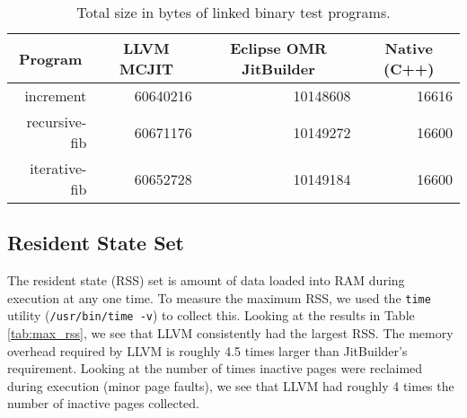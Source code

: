 \begin{table*}[t]
  \begin{tabular}{|r|l|l|l|} 
  \hline
  \multicolumn{1}{|c|}{\textbf{Program}}
  & \multicolumn{1}{c|}{\textbf{LLVM MCJIT}}                      
  & \multicolumn{1}{c|}{\textbf{Eclipse OMR JitBuilder}}
  & \multicolumn{1}{c|}{\textbf{Native (C++)}}                    
  \\ \hline

  increment                               
  & \multicolumn{1}{r|}{\num{60640216}} %
  & \multicolumn{1}{r|}{\num{10148608}} %
  & \multicolumn{1}{r|}{\num{16616}}    %
  \\ \hline
  
  recursive-fib                           
  & \multicolumn{1}{r|}{\num{60671176}} %
  & \multicolumn{1}{r|}{\num{10149272}} %
  & \multicolumn{1}{r|}{\num{16600}}   %
  \\ \hline
  
  iterative-fib                           
  & \multicolumn{1}{r|}{\num{60652728}} %
  & \multicolumn{1}{r|}{\num{10149184}} %
  & \multicolumn{1}{r|}{\num{16600}}   %
  \\ \hline
  
\end{tabular}
  \caption{Total size in bytes of linked binary test programs.}
  \label{tab:size_in_bytes}
\end{table*}

\subsection{Resident State Set}
The resident state (RSS) set is amount of data loaded into RAM during execution at any one time.
To measure the maximum RSS, we used the \texttt{time} utility (\texttt{/usr/bin/time -v}) to collect this.
Looking at the results in Table \ref{tab:max_rss}, we see that LLVM consistently had the largest RSS.
The memory overhead required by LLVM is roughly 4.5 times larger than JitBuilder's requirement.
Looking at the number of times inactive pages were reclaimed during execution (minor page faults), we see that LLVM had roughly 4 times the number of inactive pages collected.

